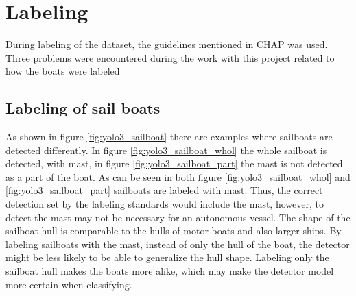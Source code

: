 \newpage

\section{Labeling}

During labeling of the dataset, the guidelines mentioned in CHAP was used. Three problems were encountered during the work with this project related to how the boats were labeled

\subsection{Labeling of sail boats}

As shown in figure \ref{fig:yolo3_sailboat} there are examples where sailboats are detected differently. In figure \ref{fig:yolo3_sailboat_whol} the whole sailboat is detected, with mast, in figure \ref{fig:yolo3_sailboat_part} the mast is not detected as a part of the boat. As can be seen in both figure \ref{fig:yolo3_sailboat_whol} and \ref{fig:yolo3_sailboat_part} sailboats are labeled with mast. Thus, the correct detection set by the labeling standards would include the mast, however, to detect the mast may not be necessary for an autonomous vessel. The shape of the sailboat hull is comparable to the hulls of motor boats and also larger ships. By labeling sailboats with the mast, instead of only the hull of the boat, the detector might be less likely to be able to generalize the hull shape. Labeling only the sailboat hull makes the boats more alike, which may make the detector model more certain when classifying. 



